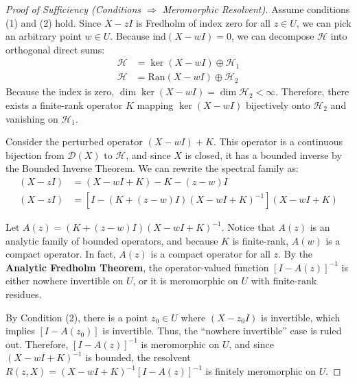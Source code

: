 \documentclass[JHEP,12pt]{article}
\begin{document}
\begin{proof}[Proof of Sufficiency (Conditions $\Rightarrow$ Meromorphic Resolvent)]
Assume conditions (1) and (2) hold. Since $X - zI$ is Fredholm of index zero for all $z \in U$, we can pick an arbitrary point $w \in U$. Because $\text{ind}(X - wI) = 0$, we can decompose $\mathcal{H}$ into orthogonal direct sums:
\begin{align*}
    \mathcal{H} &= \ker(X - wI) \oplus \mathcal{H}_1 \\
    \mathcal{H} &= \text{Ran}(X - wI) \oplus \mathcal{H}_2
\end{align*}
Because the index is zero, $\dim \ker(X - wI) = \dim \mathcal{H}_2 < \infty$. Therefore, there exists a finite-rank operator $K$ mapping $\ker(X - wI)$ bijectively onto $\mathcal{H}_2$ and vanishing on $\mathcal{H}_1$.

Consider the perturbed operator $(X - wI) + K$. This operator is a continuous bijection from $\mathcal{D}(X)$ to $\mathcal{H}$, and since $X$ is closed, it has a bounded inverse by the Bounded Inverse Theorem. We can rewrite the spectral family as:
\begin{align*}
    (X - zI) &= (X - wI + K) - K - (z - w)I \\
    (X - zI) &= \left[ I - \left( K + (z - w)I \right) (X - wI + K)^{-1} \right] (X - wI + K)
\end{align*}

Let $A(z) = \left( K + (z - w)I \right) (X - wI + K)^{-1}$. Notice that $A(z)$ is an analytic family of bounded operators, and because $K$ is finite-rank, $A(w)$ is a compact operator. In fact, $A(z)$ is a compact operator for all $z$. By the \textbf{Analytic Fredholm Theorem}, the operator-valued function $[I - A(z)]^{-1}$ is either nowhere invertible on $U$, or it is meromorphic on $U$ with finite-rank residues. 

By Condition (2), there is a point $z_0 \in U$ where $(X - z_0I)$ is invertible, which implies $[I - A(z_0)]$ is invertible. Thus, the ``nowhere invertible'' case is ruled out. Therefore, $[I - A(z)]^{-1}$ is meromorphic on $U$, and since $(X - wI + K)^{-1}$ is bounded, the resolvent $R(z, X) = (X - wI + K)^{-1} [I - A(z)]^{-1}$ is finitely meromorphic on $U$.
\end{proof}
\end{document}
